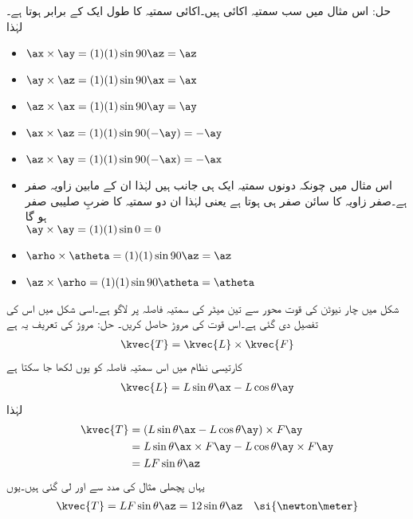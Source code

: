 حل: اس مثال میں سب سمتیہ اکائی ہیں۔اکائی سمتیہ کا طول ایک کے برابر ہوتا ہے۔ لہٰذا
\begin{itemize}
\item
$\ax \times \ay=(1)(1) \sin 90 \az =\az$\\
\item
$\ay \times \az=(1)(1) \sin 90 \ax =\ax$\\
\item
$\az \times \ax=(1)(1) \sin 90 \ay =\ay$\\
\item
$\ax \times \az=(1)(1) \sin 90 (-\ay) =-\ay$\\
\item
$\az \times \ay=(1)(1) \sin 90 (-\ax) =-\ax$\\
\item
اس مثال میں چونکہ دونوں سمتیہ ایک ہی جانب ہیں لہٰذا ان کے مابین زاویہ صفر ہے۔صفر زاویہ کا سائن صفر ہی ہوتا ہے یعنی  لہٰذا ان دو سمتیہ کا ضربِ صلیبی صفر ہو گا\\
$\ay \times \ay=(1)(1) \sin 0  =0$\\
\item
$\arho \times \atheta=(1)(1) \sin 90  \az =\az$\\
\item
$\az \times \arho=(1)(1) \sin 90 \atheta =\atheta $\\
\end{itemize}
%
شکل  میں  چار نیوٹن کی قوت  محور سے تین میٹر کی سمتیہ فاصلہ   پر لاگو ہے۔اسی شکل میں اس کی تفصیل دی گئی ہے۔اس قوت کی مروڑ  حاصل کریں۔
	حل:
	مروڑ  کی تعریف یہ ہے
\begin{align}
\kvec{T}=\kvec{L} \times \kvec{F}
\end{align}
کارتیسی نظام میں اس سمتیہ فاصلہ کو یوں لکھا جا سکتا ہے
\begin{align}
\kvec{L}=L \sin \theta \ax-L \cos \theta \ay
\end{align}
لہٰذا
\begin{align*}
\kvec{T}&=\left(L \sin \theta \ax-L \cos \theta \ay \right) \times F \ay\\
&=L \sin \theta \ax \times F \ay-L \cos \theta \ay \times F \ay\\
&= L F \sin \theta \az
\end{align*} 
یہاں پچھلی مثال کی مدد سے  اور  لی گئی ہیں۔یوں
\begin{align*}
\kvec{T}= L F \sin \theta \az=12 \sin \theta \az \quad \si{\newton \meter}
\end{align*}
